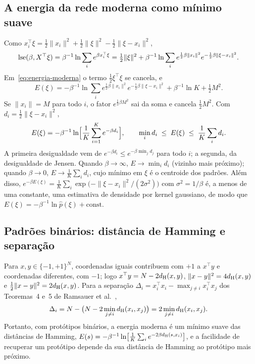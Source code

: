 \subsection{A energia da rede moderna como mínimo suave}
Como $x_i^{\top}\xi=\tfrac12\|x_i\|^2+\tfrac12\|\xi\|^2-\tfrac12\|\xi-x_i\|^2$,
\[
\operatorname{lse}(\beta,X^{\top}\xi)=\beta^{-1}\ln\sum_i e^{\beta x_i^{\top}\xi}
=\tfrac12\|\xi\|^2+\beta^{-1}\ln\sum_i e^{\frac12\beta\|x_i\|^2}e^{-\frac12\beta\|\xi-x_i\|^2}.
\]
Em~\eqref{eq:energia-moderna} o termo $\tfrac12\xi^{\top}\xi$ se cancela, e
\[
E(\xi)=-\beta^{-1}\ln\sum_i e^{\frac12\beta\|x_i\|^2}e^{-\frac12\beta\|\xi-x_i\|^2}+\beta^{-1}\ln K+\tfrac12M^2 .
\]
Se $\|x_i\|=M$ para todo $i$, o fator $e^{\frac12\beta M^2}$ sai da soma e cancela $\tfrac12M^2$. Com
$d_i=\tfrac12\|\xi-x_i\|^2$,
\[
E(\xi)=-\beta^{-1}\ln\Bigl[\frac1K\sum_{i=1}^{K}e^{-\beta d_i}\Bigr],\qquad
\min_i d_i\;\le\;E(\xi)\;\le\;\frac1K\sum_i d_i .
\]
A primeira desigualdade vem de $e^{-\beta d_i}\le e^{-\beta\min_j d_j}$ para todo $i$; a segunda, da
desigualdade de Jensen. Quando $\beta\to\infty$, $E\to\min_i d_i$ (vizinho mais próximo); quando $\beta\to0$,
$E\to\tfrac1K\sum_i d_i$, cujo mínimo em $\xi$ é o centroide dos padrões. Além disso,
$e^{-\beta E(\xi)}=\tfrac1K\sum_i\exp\bigl(-\|\xi-x_i\|^2/(2\sigma^2)\bigr)$ com $\sigma^2=1/\beta$ é, a menos
de uma constante, uma estimativa de densidade por kernel gaussiano, de modo que $E(\xi)=-\beta^{-1}\ln\hat p(\xi)+\text{const.}$

\subsection{Padrões binários: distância de Hamming e separação}
Para $x,y\in\{-1,+1\}^N$, coordenadas iguais contribuem com $+1$ a $x^{\top}y$ e coordenadas diferentes, com
$-1$; logo $x^{\top}y=N-2d_{\mathrm{H}}(x,y)$, $\|x-y\|^2=4d_{\mathrm{H}}(x,y)$ e $\tfrac12\|x-y\|^2=2d_{\mathrm{H}}(x,y)$. Para a separação
$\Delta_i=x_i^{\top}x_i-\max_{j\neq i}x_i^{\top}x_j$ dos Teoremas~4 e~5 de Ramsauer et al.~\cite{ramsauer2021},
\[
\Delta_i=N-\bigl(N-2\min_{j\neq i}d_{\mathrm{H}}(x_i,x_j)\bigr)=2\min_{j\neq i}d_{\mathrm{H}}(x_i,x_j).
\]
Portanto, com protótipos binários, a energia moderna é um mínimo suave das distâncias de Hamming,
$E(s)=-\beta^{-1}\ln\bigl[\tfrac1K\sum_ie^{-2\beta d_{\mathrm{H}}(s,x_i)}\bigr]$, e a facilidade de recuperar um protótipo
depende da sua distância de Hamming ao protótipo mais próximo.


